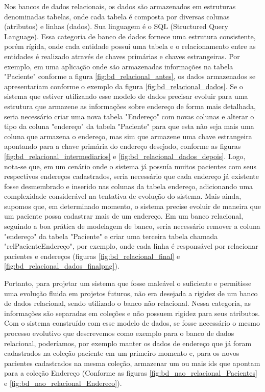 Nos bancos de dados relacionais, os dados são armazenados em estruturas denominadas tabelas, onde cada tabela é composta por diversas colunas (atributos) e linhas (dados). Sua linguagem é o SQL (Structured Query Language). Essa categoria de banco de dados fornece uma estrutura consistente, porém rígida, onde cada entidade possui uma tabela e o relacionamento entre as entidades é realizado através de chaves primárias e chaves estrangeiras. Por exemplo, em uma aplicação onde são armazenadas informações na tabela "Paciente" conforme a figura \ref{fig:bd_relacional_antes}, os dados armazenados se apresentariam conforme o exemplo da figura \ref{fig:bd_relacional_dados}. Se o sistema que estiver utilizando esse modelo de dados precisar evoluir para uma estrutura que armazene as informações sobre endereço de forma mais detalhada, seria necessário criar uma nova tabela "Endereço" com novas colunas e alterar o tipo da coluna "endereço" da tabela "Paciente" para que esta não seja mais uma coluna que armazena o endereço, mas sim que armazene uma chave estrangeira apontando para a chave primária do endereço desejado, conforme as figuras \ref{fig:bd_relacional_intermediarios} e \ref{fig:bd_relacional_dados_depois}. Logo, nota-se que, em um cenário onde o sistema já possuía muitos pacientes com seus respectivos endereços cadastrados, seria necessário que cada endereço já existente fosse desmembrado e inserido nas colunas da tabela endereço, adicionando uma complexidade considerável na tentativa de evolução do sistema. Mais ainda, supomos que, em determinado momento, o sistema precise evoluir de maneira que um paciente possa cadastrar mais de um endereço. Em um banco relacional, seguindo a boa prática de modelagem de banco, seria necessário remover a coluna "endereço" da tabela "Paciente" e criar uma terceira tabela chamada "relPacienteEndereço", por exemplo, onde cada linha é responsável por relacionar pacientes e endereços (figuras \ref{fig:bd_relacional_final} e \ref{fig:bd_relacional_dados_finalpng}).


Portanto, para projetar um sistema que fosse maleável o suficiente e permitisse uma evolução fluida em projetos futuros, não era desejada a rigidez de um banco de dados relacional, sendo utilizado o banco não relacional. Nessa categoria, as informações são separadas em coleções e não possuem rigidez para seus atributos. Com o sistema construído com esse modelo de dados, se fosse necessário o mesmo processo evolutivo que descrevemos como exemplo para o banco de dados relacional, poderíamos, por exemplo manter os dados de endereço que já foram cadastrados na coleção paciente em um primeiro momento e, para os novos pacientes cadastrados na mesma coleção, armazenar um ou mais ids que apontam para a coleção Endereço (Conforme as figuras \ref{fig:bd_nao_relacional_Pacientes} e \ref{fig:bd_nao_relacional_Endereco}).

